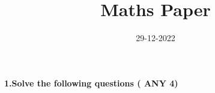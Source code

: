 \documentclass{article}
\title{Maths Paper}
\date{29-12-2022}
\begin{document}
\paragraph{1.Solve the following questions ( ANY 4)}
\end{document}

